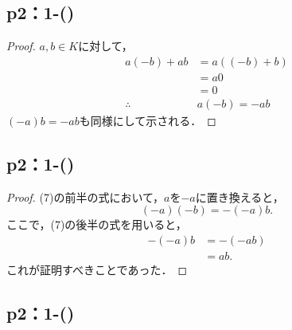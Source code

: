 \subsection*{p2：1-()}

\begin{leftbar}
    \begin{proof}
        $a,b \in K$に対して，
        \begin{align*}
            a(-b)+ab         & = a((-b)+b) \\
                             & = a0        \\
                             & =0          \\
            \therefore \quad & a(-b)=-ab
        \end{align*}
        $(-a)b = -ab$も同様にして示される．
    \end{proof}
\end{leftbar}

\subsection*{p2：1-()}

\begin{leftbar}
    \begin{proof}
        (7)の前半の式において，$a$を$-a$に置き換えると，
        \[
            (-a)(-b) = -(-a)b.
        \]
        ここで，(7)の後半の式を用いると，
        \begin{align*}
            -(-a)b & = -(-ab) \\
                   & = ab.
        \end{align*}
        これが証明すべきことであった．
    \end{proof}
\end{leftbar}


\subsection*{p2：1-()}

